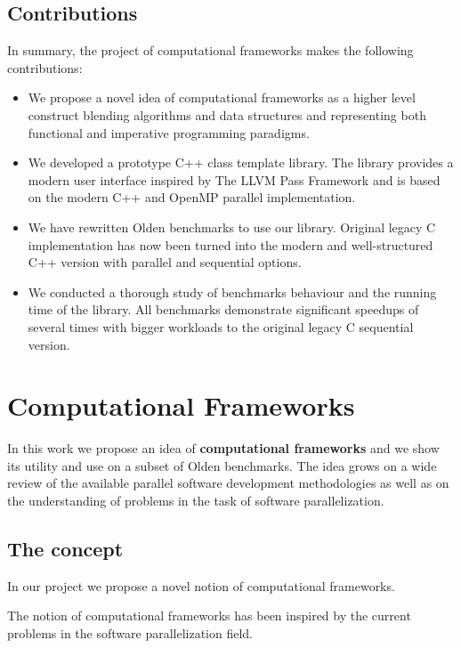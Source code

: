 \subsection{Contributions}
\label{frameworks_contributions}
\quad In summary, the project of computational frameworks makes the following contributions:
%
\begin{itemize}
\renewcommand\labelitemi{$\vartriangleright$}
\renewcommand\labelitemii{$\bullet$}
\item We propose a novel idea of computational frameworks as a higher level construct blending algorithms and data structures and representing both functional and imperative programming paradigms.
\item We developed a prototype C++ class template library. The library provides a modern user interface inspired by The LLVM Pass Framework and is based on the modern C++ and OpenMP parallel implementation.
\item We have rewritten Olden benchmarks to use our library. Original legacy C implementation has now been turned into the modern and well-structured C++ version with parallel and sequential options.
\item We conducted a thorough study of benchmarks behaviour and the running time of the library. All benchmarks demonstrate significant speedups of several times with bigger workloads to the original legacy C sequential version.
\end{itemize}

\section{Computational Frameworks}
\label{computational_frameworks_main}
\quad In this work we propose an idea of \textbf{computational frameworks} and we show its utility and use on a subset of Olden benchmarks. The idea grows on a wide review of the available parallel software development methodologies as well as on the understanding of problems in the task of software parallelization.  

\subsection{The concept}
\label{frameworks_concept}
\quad In our project we propose a novel notion of computational frameworks. 

The notion of computational frameworks has been inspired by the current problems in the software parallelization field. 

